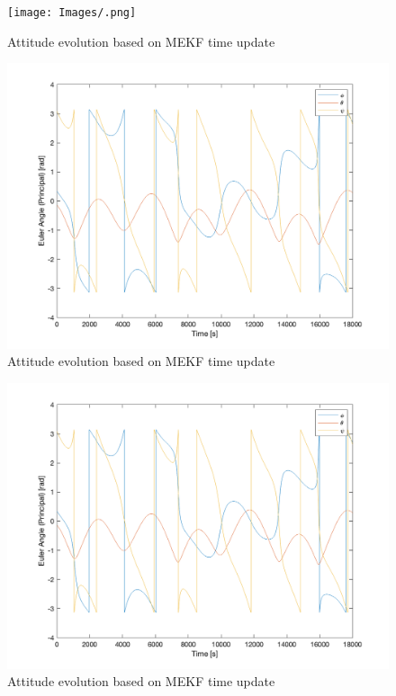 \begin{figure}[H]
\centering
\texttt{[image: Images/.png]}
\caption{Attitude evolution based on MEKF time update}
\label{fig:ps7_problem5a_angle_est}
\end{figure}

\begin{figure}[H]
\centering
\includegraphics[scale=0.6]{Images/ps7_problem5a_angle_est.png}
\caption{Attitude evolution based on MEKF time update}
\label{fig:ps7_problem5a_angle_est}
\end{figure}

\begin{figure}[H]
\centering
\includegraphics[scale=0.6]{Images/ps7_problem5a_angle_est.png}
\caption{Attitude evolution based on MEKF time update}
\label{fig:ps7_problem5a_angle_est}
\end{figure}

